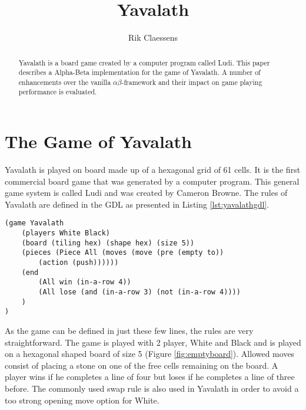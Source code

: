 \documentclass[11pt]{article}
\begin{document}
\title{{\Huge Yavalath} \\ \vspace{0.5em}{\large August 2014 - Intelligent Search \& Games\\ Master Artificial Intelligence, Maastricht University}}	
\author{Rik Claessens}

\maketitle

\begin{abstract}
Yavalath is a board game created by a computer program called Ludi. This paper describes a Alpha-Beta implementation for the game of Yavalath. A number of enhancements over the vanilla $\alpha \beta$-framework and their impact on game playing performance is evaluated.
\end{abstract}

\section{The Game of Yavalath}
\label{-sec:thegameofyavalath}
Yavalath is played on board made up of a hexagonal grid of 61 cells. It is the first commercial board game that was generated by a computer program. This general game system is called Ludi and was created by Cameron Browne. The rules of Yavalath are defined in the \ac{GDL} as presented in Listing \ref{lst:yavalathgdl}. 

\listingspace
\begin{lstlisting}[caption={The Yavalath definition in GDL}]
(game Yavalath
	(players White Black)
	(board (tiling hex) (shape hex) (size 5))
	(pieces (Piece All (moves (move (pre (empty to))
		(action (push)))))) 
	(end
		(All win (in-a-row 4))
		(All lose (and (in-a-row 3) (not (in-a-row 4))))
	)
)
\end{lstlisting}
\label{lst:yavalathgdl}
\listingspace

As the game can be defined in just these few lines, the rules are very straightforward. The game is played with 2 player, White and Black and is played on a hexagonal shaped board of size 5 (Figure \ref{fig:emptyboard}). Allowed moves consist of placing a stone on one of the free cells remaining on the board. A player wins if he completes a line of four but loses if he completes a line of three before. The commonly used swap rule is also used in Yavalath in order to avoid a too strong opening move option for White. 
\end{document}
